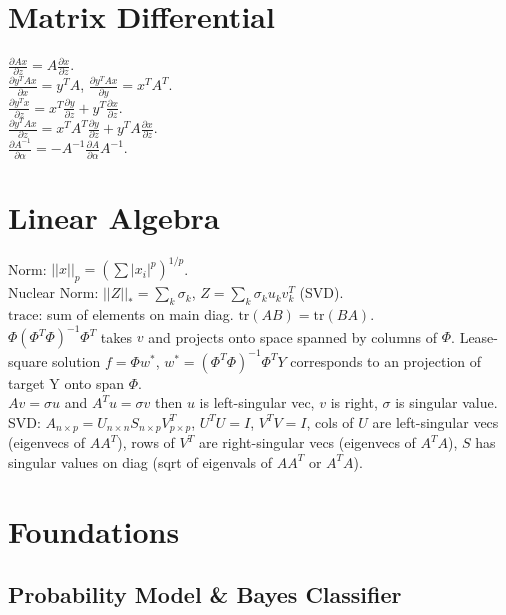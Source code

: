 \section{Matrix Differential}

$\frac{\partial Ax}{\partial z} = A\frac{\partial x}{\partial z}$.\\
$\frac{\partial y^T A x}{\partial x} = y^T A$, $\frac{\partial y^T A x}{\partial y} = x^T A^T$.\\
$\frac{\partial y^T x}{\partial z} = x^T\frac{\partial y}{\partial z} + y^T \frac{\partial x}{\partial z}$.\\
$\frac{\partial y^T A x}{\partial z} = x^T A^T \frac{\partial y}{\partial z} + y^T A\frac{\partial x}{\partial z}$.\\
$\frac{\partial A^{-1}}{\partial \alpha} = -A^{-1}\frac{\partial A}{\partial \alpha} A^{-1}$.

\section{Linear Algebra}

Norm: $||x||_p = (\sum |x_i|^p)^{1/p}$.\\
Nuclear Norm: $||Z||_* = \sum_k\sigma_k$, $Z = \sum_k \sigma_k u_k v_k^T$ (SVD).\\
$\text{trace}$: sum of elements on main diag. $\text{tr}(AB) = \text{tr}(BA)$.\\
$\Phi(\Phi^T \Phi)^{-1}\Phi^T$ takes $v$ and projects onto space spanned by columns of $\Phi$. Lease-square solution $f=\Phi w^*$, $w^*=(\Phi^T \Phi)^{-1}\Phi^T Y$ corresponds to an projection of target Y onto span $\Phi$.\\
$Av=\sigma u$ and $A^Tu=\sigma v$ then $u$ is left-singular vec, $v$ is right, $\sigma$ is singular value.\\
SVD: $A_{n\times p} = U_{n\times n}S_{n\times p}V_{p\times p}^T$, $U^TU = I$, $V^TV = I$, cols of $U$ are left-singular vecs (eigenvecs of $AA^T$), rows of $V^T$ are right-singular vecs (eigenvecs of $A^TA$), $S$ has singular values on diag (sqrt of eigenvals of $AA^T$ or $A^TA$).

\section{Foundations}

\subsection*{Probability Model \& Bayes Classifier}

